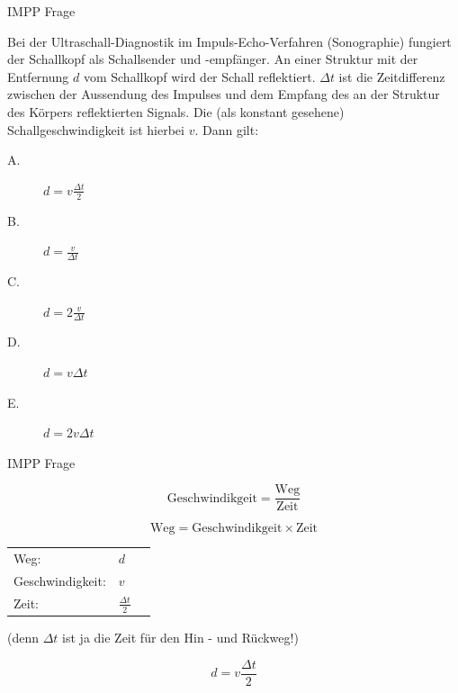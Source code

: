 \documentclass{beamer}
\begin{document}
\begin{frame}{IMPP Frage}

Bei der Ultraschall-Diagnostik im Impuls-Echo-Verfahren (Sonographie) fungiert der Schallkopf als Schallsender und -empfänger. An einer Struktur mit der Entfernung \(d\) vom Schallkopf wird der Schall reflektiert. \(\Delta t\) ist die Zeitdifferenz zwischen der Aussendung des Impulses und dem Empfang des an der Struktur des Körpers reflektierten Signals. Die (als konstant gesehene) Schallgeschwindigkeit ist hierbei \(v\). Dann gilt:\\[0.2 cm]

\begin{description}
\item[A.]
\(d=v \frac{\Delta t}{2} \) \\[0.3 cm]
\item[B.]
\(d= \frac{v}{\Delta t}\) \\[0.3 cm]
\item[C.]
\(d= 2\frac{v}{\Delta t}\) \\[0.3 cm]
\item[D.]
\(d= v\Delta t\) \\[0.3 cm]
\item[E.]
\(d= 2v\Delta t\)
\end{description}


\end{frame}


\begin{frame}{IMPP Frage}

\[
\text{Geschwindikgeit}=\frac{\text{Weg}}{\text{Zeit}}
\]


\pause

\[
\text{Weg} = \text{Geschwindikgeit} \times \text{Zeit}
\]

\pause

\vfill 

\begin{tabular}{lll}
Weg:     & \(d\)\\
Geschwindigkeit:     & \(v\) \\
Zeit:                & \(\frac{\Delta t}{2}\)  \\ [0.5 cm]
\end{tabular}

 (denn \(\Delta t\) ist ja die Zeit für den Hin - und Rückweg!)
 
 \vfill
 
 \pause
 
 \[d=v \frac{\Delta t}{2} \]

\end{frame}
\end{document}
